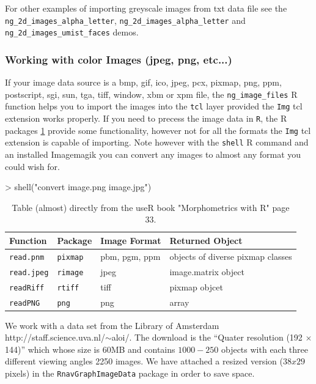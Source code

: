 \documentclass[12pt,oneside,titlepage,letter]{article}
\newcommand{\modify}[1]{{\color{blue}#1}}
\begin{document}
For other examples of importing greyscale images from txt data file see the \texttt{ng\_2d\_images\_alpha\_letter}, \texttt{ng\_2d\_images\_alpha\_letter} and \texttt{ng\_2d\_images\_umist\_faces} demos.


\subsubsection{Working with color Images (jpeg, png, etc...)}

If your image data source is a bmp, gif, ico, jpeg, pcx, pixmap, png, ppm, postscript, sgi, sun, tga, tiff, window, xbm or xpm file, the \texttt{ng\_image\_files} R function helps you to import the images into the \texttt{tcl} layer provided the \texttt{Img} tcl extension works properly. If you need to precess the image data in \texttt{R}, the R packages \ref{tab:ImagesInR} provide some functionality, however not for all the formats the \texttt{Img} tcl extension is capable of importing. Note however with the \texttt{shell} R command and an installed Imagemagik you can convert any images to almost any format you could wish for.\\
\begin{Schunk}
\begin{Sinput}
> shell("convert image.png image.jpg")
\end{Sinput}
\end{Schunk}

\begin{table}[h]
  \label{tab:ImagesInR}
  \centering
  \begin{tabular}{llll}
    \hline
    Function & Package & Image Format & Returned Object\\
    \hline
    \texttt{read.pnm} & \texttt{pixmap} & pbm, pgm, ppm & objects of diverse pixmap classes\\
    \texttt{read.jpeg} & \texttt{rimage} & jpeg & image.matrix object\\
    \texttt{readRiff} & \texttt{rtiff} & tiff & pixmap objcet\\
    \texttt{readPNG} & \texttt{png} & png & array\\
    \hline
  \end{tabular}    
  \caption{\modify{Table (almost) directly from the useR book "Morphometrics with R" page 33.}}
\end{table}


We work with a data set from the Library of Amsterdam \modify{http://staff.science.uva.nl/$\sim$aloi/}. The download is the ``Quater resolution (192 $\times$ 144)'' which whose size is 60MB and contains $1000-250$ objects with each three different viewing angles \modify{2250} images. We have attached a resized version ($38x29$ pixels) in the \texttt{RnavGraphImageData} package in order to save space. 
\end{document}
